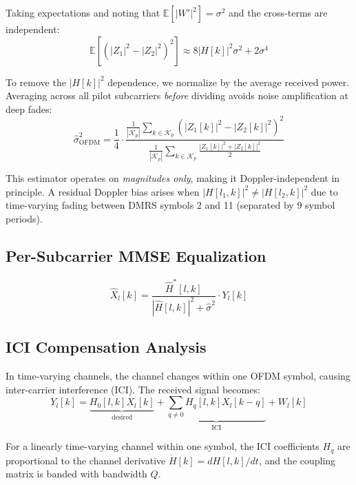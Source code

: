 \documentclass[11pt,a4paper,twoside]{article}
\newcommand{\E}{\mathbb{E}}
\newcommand{\Hest}{\hat{H}}
\newcommand{\nest}{\hat{\sigma}^2}
\begin{document}
Taking expectations and noting that $\E[|W'|^2] = \sigma^2$ and the cross-terms are independent:
\begin{equation}
    \E\!\left[\left(|Z_1|^2 - |Z_2|^2\right)^2\right] \approx 8|H[k]|^2\sigma^2 + 2\sigma^4
\end{equation}

To remove the $|H[k]|^2$ dependence, we normalize by the average received power. Averaging across all pilot subcarriers \emph{before} dividing avoids noise amplification at deep fades:
\begin{equation}
    \boxed{\nest_{\text{OFDM}} = \frac{1}{4} \cdot \frac{\frac{1}{|\mathcal{K}_p|}\displaystyle\sum_{k \in \mathcal{K}_p} \left(|Z_1[k]|^2 - |Z_2[k]|^2\right)^2}{\frac{1}{|\mathcal{K}_p|}\displaystyle\sum_{k \in \mathcal{K}_p} \frac{|Z_1[k]|^2 + |Z_2[k]|^2}{2}}}
    \label{eq:noise_ofdm}
\end{equation}

This estimator operates on \emph{magnitudes only}, making it Doppler-independent in principle. A residual Doppler bias arises when $|H[l_1,k]|^2 \neq |H[l_2,k]|^2$ due to time-varying fading between DMRS symbols 2 and 11 (separated by 9 symbol periods).

\subsection{Per-Subcarrier MMSE Equalization}

\begin{equation}
    \hat{X}_l[k] = \frac{\Hest^*[l,k]}{|\Hest[l,k]|^2 + \nest} \cdot Y_l[k]
\end{equation}

\subsection{ICI Compensation Analysis}
\label{sec:ici}

In time-varying channels, the channel changes within one OFDM symbol, causing inter-carrier interference (ICI). The received signal becomes:
\begin{equation}
    Y_l[k] = \underbrace{H_0[l,k] X_l[k]}_{\text{desired}} + \underbrace{\sum_{q \neq 0} H_q[l,k] X_l[k-q]}_{\text{ICI}} + W_l[k]
\end{equation}

For a linearly time-varying channel within one symbol, the ICI coefficients $H_q$ are proportional to the channel derivative $\dot{H}[k] = dH[l,k]/dt$, and the coupling matrix is banded with bandwidth $Q$.
\end{document}
